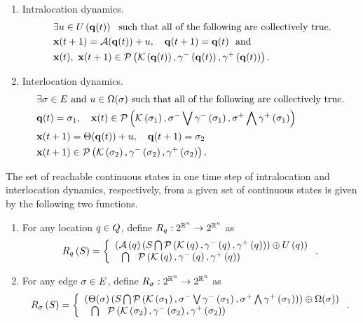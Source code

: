 \begin{enumerate}
\item Intralocation dynamics.
\begin{align}~\label{eqn:intralocation}
\begin{split}
& \exists u\in U\left({\bf q}(t)\right)~~\text{such that all of
    the following  are collectively true.}\\
& {\bf x}(t+1) = \mathcal{A}({\bf q}(t))+u,~~~{\bf q}(t+1) = {\bf q}(t)~~
\text{and}\\
& {\bf x}(t),~{\bf x}(t+1)\in\mathcal{P}\left(\mathcal{K}\left({\bf q}(t)\right),\gamma^-\left({\bf q}(t)\right),\gamma^+\left({\bf q}(t)\right)\right).
\end{split}
\end{align}
\item Interlocation dynamics.
\begin{align} 
\begin{split}
& \exists \sigma\in E~\text{and}~u\in\Omega(\sigma)~\text{such
that all of the following are collectively true.}\\
& {\bf q}(t)=\sigma_{1},~~~{\bf x}(t)\in\mathcal{P}\left(\mathcal{K}\left(\sigma_{1}\right),\sigma^-\bigvee\gamma^-\left(\sigma_{1}\right),\sigma^+\bigwedge\gamma^+\left(\sigma_{1}\right)\right) \\
& {\bf x}(t+1) = \Theta({\bf q}(t))+u,~~~{\bf q}(t+1)
= \sigma_{2}\\
& {\bf x}(t+1)\in \mathcal{P}\left(\mathcal{K}\left(\sigma_{2}\right),\gamma^-\left(\sigma_{2}\right),\gamma^+\left(\sigma_{2}\right)\right).
\end{split}
\end{align}
\end{enumerate}

The set of reachable continuous states in one time step of
intralocation and interlocation dynamics, respectively, from a given
set of continuous states is given by the following two functions.
\begin{enumerate}
\item For any location $q\in Q$, define $R_{q}:2^{\mathbb{R}^n}\rightarrow 2^{\mathbb{R}^n}$ as
\begin{equation*}
R_{q}\left(S\right) = \left\{\begin{array}{l}{\left(\mathcal{A}\left(q\right)\left(S\bigcap\mathcal{P}\left(\mathcal{K}\left(q\right),\gamma^-\left(q\right),\gamma^+\left(q\right)\right)\right)\oplus
U\left(q\right)\right)}\\{~~\bigcap~~\mathcal{P}\left(\mathcal{K}\left(q\right),\gamma^-\left(q\right),\gamma^+\left(q\right)\right)} \end{array}\right..
\end{equation*}
\item For any edge $\sigma\in E$, define
  $R_{\sigma}:2^{\mathbb{R}^n}\rightarrow 2^{\mathbb{R}^n}$ as
\begin{multline*}
R_{\sigma}\left(S\right) =  \left\{\begin{array}{l}{\left(\Theta(\sigma)\left(S\bigcap
\mathcal{P}\left(\mathcal{K}\left(\sigma_{1}\right),\sigma^-\bigvee\gamma^-\left(\sigma_{1}\right),\sigma^+\bigwedge\gamma^+\left(\sigma_{1}\right)\right)\right)\oplus\Omega(\sigma)\right)}\\{~~\bigcap~~\mathcal{P}\left(\mathcal{K}\left(\sigma_{2}\right),\gamma^-\left(\sigma_{2}\right),\gamma^+\left(\sigma_{2}\right)\right)} \end{array}\right..
\end{multline*}
\end{enumerate}

